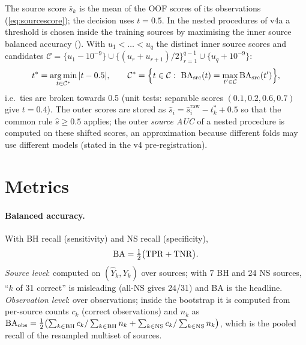 The source score $\bar s_k$ is the mean of the OOF scores of its observations (\cref{eq:sourcescore}); the decision uses
$t=0.5$. In the nested procedures of v4a a threshold is chosen inside the training sources by maximising the inner
source balanced accuracy (). With $u_1<\dots<u_q$ the distinct inner source scores and
candidates $\mathcal C = \{u_1-10^{-9}\}\cup\{(u_r+u_{r+1})/2\}_{r=1}^{q-1}\cup\{u_q+10^{-9}\}$:
\begin{equation}
t^\ast = \argmin_{t\in\mathcal C^\ast}|t-0.5|,\qquad \mathcal C^\ast = \Bigl\{t\in\mathcal C:\ \BA_\mathrm{src}(t) = \max_{t'\in\mathcal C}\BA_\mathrm{src}(t')\Bigr\}, \label{eq:choosethreshold}
\end{equation}
i.e.\ ties are broken towards 0.5 (unit tests: separable scores $(0.1,0.2,0.6,0.7)$ give $t=0.4$). The outer scores are
stored as $\hat s_i = \hat s^{\mathrm{raw}}_i - t^\ast_k + 0.5$ so that the common rule $\hat s\ge0.5$ applies; the
outer \emph{source AUC} of a nested procedure is computed on these shifted scores, an approximation because different
folds may use different models (stated in the v4 pre-registration).

\section{Metrics}\label{sec:metrics}

\paragraph{Balanced accuracy.} With BH recall (sensitivity) and NS recall (specificity),
\begin{equation}
\operatorname{BA} = \tfrac12\bigl(\mathrm{TPR}+\mathrm{TNR}\bigr). \label{eq:ba}
\end{equation}
\emph{Source level}: computed on $(\hat Y_k, Y_k)$ over sources; with 7 BH and 24 NS sources, ``$k$ of 31 correct'' is
misleading (all-NS gives 24/31) and BA is the headline. \emph{Observation level}: over observations; inside the bootstrap
it is computed from per-source counts $c_k$ (correct observations) and $n_k$ as
$\operatorname{BA}_\mathrm{obs}=\tfrac12\bigl(\sum_{k\in\mathrm{BH}}c_k/\sum_{k\in\mathrm{BH}}n_k + \sum_{k\in\mathrm{NS}}c_k/\sum_{k\in\mathrm{NS}}n_k\bigr)$,
which is the pooled recall of the resampled multiset of sources.

